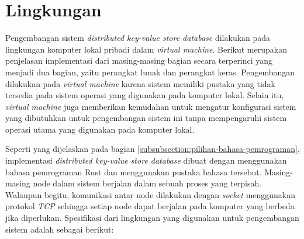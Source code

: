 \section{Lingkungan}
\label{sec:environment}

Pengembangan sistem \textit{distributed key-value store database} dilakukan pada lingkungan komputer lokal pribadi dalam \textit{virtual machine}. Berikut merupakan penjelasan implementasi dari masing-masing bagian secara terperinci yang menjadi dua bagian, yaitu perangkat lunak dan perangkat keras. Pengembangan dilakukan pada \textit{virtual machine} karena sistem memiliki pustaka yang tidak tersedia pada sistem operasi yang digunakan pada komputer lokal. Selain itu, \textit{virtual machine} juga memberikan kemudahan untuk mengatur konfigurasi sistem yang dibutuhkan untuk pengembangan sistem ini tanpa mempengaruhi sistem operasi utama yang digunakan pada komputer lokal.

Seperti yang dijelaskan pada bagian \ref{subsubsection:pilihan-bahasa-pemrograman}, implementasi \textit{distributed key-value store database} dibuat dengan menggunakan bahasa pemrograman Rust dan menggunakan pustaka bahasa tersebut. Masing-masing node dalam sistem berjalan dalam sebuah proses yang terpisah. Walaupun begitu, komunikasi antar node dilakukan dengan \textit{socket} menggunakan protokol \textit{TCP} sehingga setiap node dapat berjalan pada komputer yang berbeda jika diperlukan. Spesifikasi dari lingkungan yang digunakan untuk pengembangan sistem adalah sebagai berikut:

